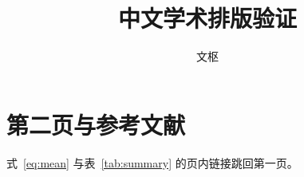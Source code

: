 \documentclass[UTF8,fontset=fandol]{ctexart}
\title{中文学术排版验证}
\author{文枢}
\date{}
\begin{document}
\maketitle

\newpage
\section{第二页与参考文献}
式~\eqref{eq:mean} 与表~\ref{tab:summary} 的页内链接跳回第一页。


\end{document}
